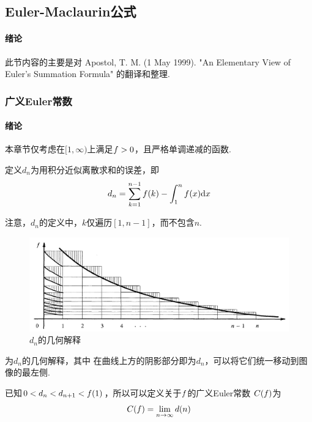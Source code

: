 \subsection{Euler-Maclaurin公式}
  \paragraph{绪论}
   此节内容的主要是对 Apostol, T. M. (1 May 1999).
   "An Elementary View of Euler's Summation Formula"
   的翻译和整理.

  \subsubsection{广义Euler常数}
    \paragraph{绪论}
      本章节仅考虑在$[1,\infty)$上满足$\mathnormal{f}>0$，且严格单调递减的函数.

    \begin{defi}[$d_n$]
      定义$d_n$为用积分近似离散求和的误差，即
      \begin{equation}
        \label{equ: d_n}
        d_n = \sum_{k=1}^{n-1}\mathnormal{f}(k) - \int_1^n\mathnormal{f}(x)\mathrm{d} x
      \end{equation}
    \end{defi}
    \remark
      注意，$d_n$的定义中，$k$仅遍历$[1, n-1]$，而不包含$n$.
      \begin{figure}[htbp]
        \centering
        \includegraphics[width=15cm]{../image/d_n.png}
        \caption{$d_n$的几何解释}
        \label{fig: d_n的几何解释}
      \end{figure}
      为$d_n$的几何解释，其中
      在曲线上方的阴影部分即为$d_n$，可以将它们统一移动到图像的最左侧.

    \begin{defi}[广义Euler常数]
      已知$0<d_n<d_{n+1}<\mathnormal{f}(1)$，所以可以定义关于$\mathnormal{f}$的广义Euler常数
      $C(\mathnormal{f})$为
      \[
        C(\mathnormal{f}) = \lim_{n\to\infty}d(n)
      \]
    \end{defi}

